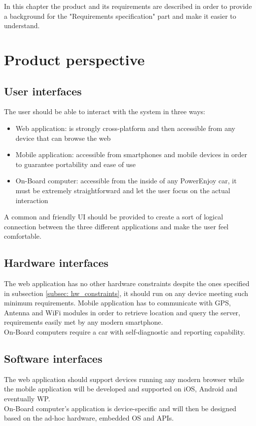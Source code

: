 In this chapter the product and its requirements are described in order to provide a background for the "Requirements specification" part and make it easier to understand.

\section{Product perspective}

\subsection{User interfaces} %
\label{subsec:user_interfaces}
The user should be able to interact with the system in three ways:
\begin{itemize}
	\item{Web application}: is strongly cross-platform and then accessible from any device that can browse the web
	\item{Mobile application}: accessible from smartphones and mobile devices in order to guarantee portability and ease of use
	\item{On-Board computer}: accessible from the inside of any PowerEnjoy car, it must be extremely straightforward and let the user focus on the actual interaction
\end{itemize}
A common and friendly UI should be provided to create a sort of logical connection between the three different applications and make the user feel comfortable.

\subsection{Hardware interfaces}
The web application has no other hardware constraints despite the ones specified in subsection \ref{subsec: hw_constraints}, it should run on any device meeting such minimum requirements. Mobile application has to communicate with GPS, Antenna and WiFi modules in order to retrieve location and query the server, requirements easily met by any modern smartphone.
\\On-Board computers require a car with self-diagnostic and reporting capability.

\subsection{Software interfaces}
The web application should support devices running any modern browser while the mobile application will be developed and supported on iOS, Android and eventually WP. 
\\On-Board computer's application is device-specific and will then be designed based on the ad-hoc hardware, embedded OS and APIs.

